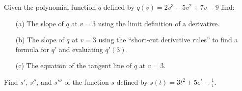 \documentclass[handout,nooutcomes]{ximera}
\begin{document}
\begin{problem}
  Given the polynomial function $q$ defined by $q(v) = 2v^3 - 5v^2 + 7v - 9$ find:
  \begin{itemize}
    \item[(a)]
      The slope of $q$ at $v = 3$ using the limit definition of a derivative.

    \item[(b)]
      The slope of $q$ at $v = 3$ using the ``short-cut derivative rules'' to find a formula for $q'$ and evaluating $q'(3)$.

    \item[(c)]
      The equation of the tangent line of $q$ at $v = 3$.
  \end{itemize}
\end{problem}

\begin{problem}
   Find $s'$, $s''$, and $s'''$ of the function $s$ defined by $s(t) = 3t^2 + 5e^t - \frac{1}{t}$.
\end{problem}
\end{document}
